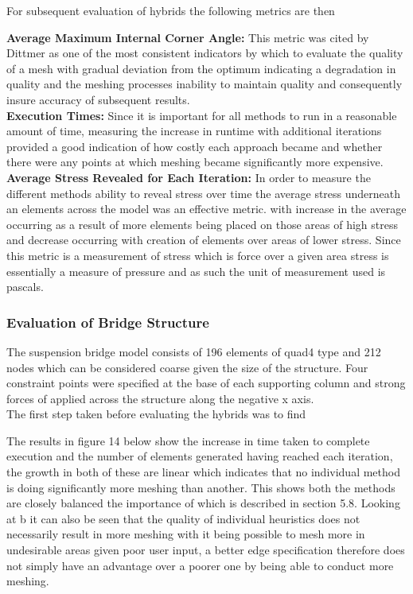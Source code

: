 For subsequent evaluation of hybrids the following metrics are then 

\noindent
\textbf{Average Maximum Internal Corner Angle: } This metric was cited by Dittmer \cite{DittmerMeshQualityMet}as one of the most consistent indicators by which to evaluate the quality of a mesh with gradual deviation from the optimum indicating a degradation in quality and the meshing processes inability to maintain quality and consequently insure accuracy of subsequent results. \\ 

\noindent
\textbf{Execution Times: } Since it is important for all methods to run in a reasonable amount of time, measuring the increase in runtime with additional iterations provided a good indication of how costly each approach became and whether there were any points at which meshing became significantly more expensive. \\ 

\noindent
\textbf{Average Stress Revealed for Each Iteration: } In order to measure the different methods ability to reveal stress over time the average stress underneath an elements across the model was an effective metric. with increase in the average occurring as a result of more elements being placed on those areas of high stress and decrease occurring with creation of elements over areas of lower stress. Since this metric is a measurement of stress which is force over a given area stress is essentially a measure of pressure and as such the unit of measurement used is pascals. \\ 


\subsubsection{Evaluation of Bridge Structure}
The suspension bridge model consists of 196 elements of quad4 type and 212 nodes which can be considered coarse given the size of the structure. Four constraint points were specified at the base of each supporting column and strong forces of applied across the structure along the negative x axis. \\

The first step taken before evaluating the hybrids was to find

\noindent
The results in figure 14 below show the increase in time taken to complete execution and the number of elements generated having reached each iteration, the growth in both of these are linear which indicates that no individual method is doing significantly more meshing than another. This shows both the methods are closely balanced the importance of which is described in section 5.8. Looking at b it can also be seen that the quality of individual heuristics does not necessarily result in more meshing with it being possible to mesh more in undesirable areas given poor user input, a better edge specification  therefore does not simply have an advantage over a poorer one by being able to conduct more meshing. \\ 

